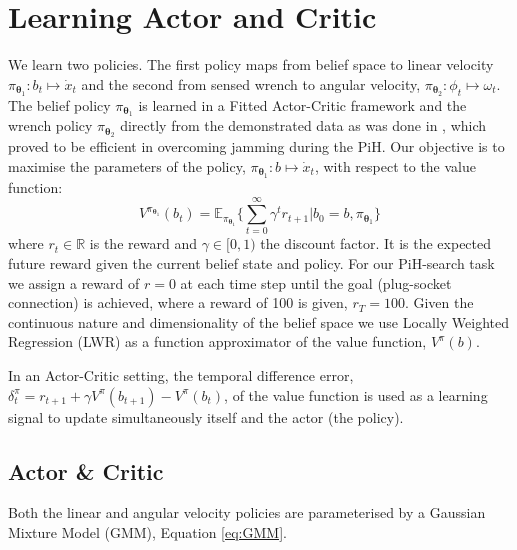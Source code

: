\documentclass[final,3p,times,twocolumn]{elsarticle}
\newcommand{\Param}{\boldsymbol{\theta}}
\begin{document}
\section{Learning Actor and Critic}\label{sec:learning-value-actor}

We learn two policies. The first policy maps from belief space 
to linear velocity $\pi_{\Param_1} : b_t \mapsto \dot{x}_t$ and the second from 
sensed wrench to angular velocity, $ \pi_{\Param_2} : \phi_t \mapsto \omega_t$.
The belief policy $\pi_{\Param_1}$ is learned in a Fitted Actor-Critic framework 
and the wrench policy $\pi_{\Param_2}$ directly from the demonstrated data as was done 
in \cite[Chap. 5]{Kronander2015}, which proved to be efficient in overcoming jamming during the PiH. 
Our objective is to maximise the parameters of the policy, $\pi_{\Param_1}: b \mapsto \dot{x}_t$, 
with respect to the value function:
\begin{equation}\label{eq:value_function}
  V^{\pi_{\Param_1}}(b_t) = \mathbb{E}_{\pi_{\Param_1}}\Bigg\{ \sum_{t=0}^{\infty} \gamma^{t} r_{t+1} | b_0=b,\pi_{\Param_1}\Bigg\}
\end{equation}
where $r_t \in \mathbb{R}$ is the reward and $\gamma \in [0,1)$ the discount factor. It is the expected future reward given the current 
belief state and policy. For our PiH-search task we assign a reward of $r=0$ at each time step until the goal
(plug-socket connection) is achieved, where a reward of 100 is given, $r_{T}=100$. Given the continuous nature and 
dimensionality of the belief space we use Locally Weighted Regression \cite{Atkeson97locallyweighted} (LWR) as a function 
approximator of the value function, $V^{\pi}(b)$.

 In an Actor-Critic setting, 
the temporal difference error, ${\delta^{\pi}_t = r_{t+1} + \gamma V^{\pi}(b_{t+1}) - V^{\pi}(b_t)}$, of the value 
function is used as a learning signal to update simultaneously itself and the actor (the policy).

\subsection{Actor \& Critic}
Both the linear and angular velocity policies are parameterised by a Gaussian Mixture Model (GMM), Equation \ref{eq:GMM}.
\end{document}
